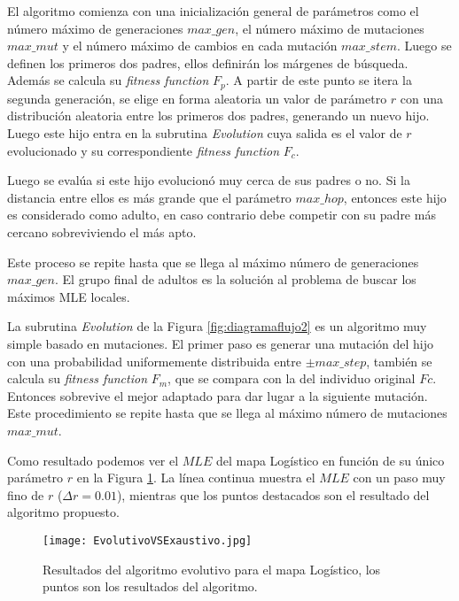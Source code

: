 El algoritmo comienza con una inicialización general de parámetros como el número máximo de generaciones $max\_gen$, el número máximo de mutaciones $max\_mut$ y el número máximo de cambios en cada mutación $max\_stem$.
Luego se definen los primeros dos padres, ellos definirán los márgenes de búsqueda.
Además se calcula su \textit{fitness function} $F_p$.
A partir de este punto se itera la segunda generación, se elige en forma aleatoria un valor de parámetro $r$ con una distribución aleatoria entre los primeros dos padres, generando un nuevo hijo.
Luego este hijo entra en la subrutina \textit{Evolution} cuya salida es el valor de $r$ evolucionado y su correspondiente \textit{fitness function} $F_c$.

Luego se evalúa si este hijo evolucionó muy cerca de sus padres o no.
Si la distancia entre ellos es más grande que el parámetro $max\_hop$, entonces este hijo es considerado como adulto, en caso contrario debe competir con su padre más cercano sobreviviendo el más apto.

Este proceso se repite hasta que se llega al máximo número de  generaciones $max\_gen$.
El grupo final de adultos es la solución al problema de buscar los máximos MLE locales.

La subrutina \textit{Evolution} de la Figura \ref{fig:diagramaflujo2} es un algoritmo muy simple basado en mutaciones.
El primer paso es generar una mutación del hijo con una probabilidad uniformemente distribuida entre $\pm max\_step$, también se calcula su \textit{fitness function} $F_m$, que se compara con la del individuo original $Fc$.
Entonces sobrevive el mejor adaptado para dar lugar a la siguiente mutación.
Este procedimiento se repite hasta que se llega al máximo número de mutaciones $max\_mut$.

Como resultado podemos ver el $MLE$ del mapa Logístico en función de su único parámetro $r$ en la Figura \ref{fig:resultadoAlgorithm}.
La línea continua muestra el $MLE$ con un paso muy fino de $r$ ($\Delta r = 0.01$), mientras que los puntos destacados son el resultado del algoritmo propuesto.
%
\begin{figure}
	\centering
	\texttt{[image: EvolutivoVSExaustivo.jpg]}\\
	\caption{Resultados del algoritmo evolutivo para el mapa Logístico, los puntos son los resultados del algoritmo.}\label{fig:resultadoAlgorithm}
\end{figure}


